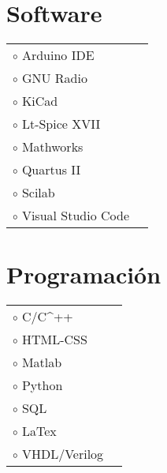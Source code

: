 \documentclass[a4paper,10pt]{article}
\begin{document}
\begin{adjustbox}{valign=t}
\begin{minipage}{0.60\textwidth}
\begin{multicols}{2}
\section*{Software}
\begin{tabular}{ll}
\textcolor{ColorOne}{$\circ$}	Arduino IDE 		& \\
\textcolor{ColorOne}{$\circ$}	GNU Radio 	        & \\
\textcolor{ColorOne}{$\circ$}	KiCad    	& \\
\textcolor{ColorOne}{$\circ$}	Lt-Spice XVII    	& \\
\textcolor{ColorOne}{$\circ$}	Mathworks 	        & \\
\textcolor{ColorOne}{$\circ$}	Quartus II        	& \\
\textcolor{ColorOne}{$\circ$}	Scilab	& \\
\textcolor{ColorOne}{$\circ$}	Visual Studio Code  & \\

\end{tabular}
\vfill\null \columnbreak 
\section*{Programación}
\begin{tabular}{ll}
\textcolor{ColorOne}{$\circ$}	C/C^{++}        & 
	\\
	
\textcolor{ColorOne}{$\circ$}	HTML-CSS        & 
	\\

\textcolor{ColorOne}{$\circ$}	Matlab 	    	& 
	\\

\textcolor{ColorOne}{$\circ$}		Python    	&
		\\
\textcolor{ColorOne}{$\circ$}	SQL    	& 
	\\
\textcolor{ColorOne}{$\circ$}		LaTex 	    & 
	\\
\textcolor{ColorOne}{$\circ$}	VHDL/Verilog 	& 
\end{tabular}
\end{multicols}
\end{minipage}
\end{adjustbox}
\end{document}

